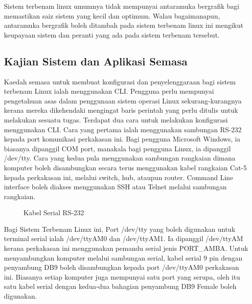 Sistem terbenam linux umumnya tidak mempunyai antaramuka bergrafik bagi memastikan saiz sistem yang kecil dan optimum. Walau bagaimanapun, antaramuka bergrafik boleh ditambah pada sistem terbenam linux ini mengikut keupayaan sistem dan peranti yang ada pada sistem terbenam tersebut.

\subsection{Kajian Sistem dan Aplikasi Semasa}
Kaedah semasa untuk membuat konfigurasi dan penyelenggaraan bagi sistem terbenam Linux ialah menggunakan CLI. Pengguna perlu mempunyai pengetahuan asas dalam penggunaan sistem operasi Linux sekurang-kurangnya kerana mereka dikehendaki mengingat baris perintah yang perlu ditulis untuk melakukan sesuatu tugas. Terdapat dua cara untuk melakukan konfigurasi menggunakan CLI. Cara yang pertama ialah menggunakan sambungan RS-232 kepada port komunikasi perkakasan ini. Bagi pengguna Microsoft Windows, ia biasanya dipanggil COM port, manakala bagi pengguna Linux, ia dipanggil /dev/tty. Cara yang kedua pula menggunakan sambungan rangkaian dimana komputer boleh disambungkan secara terus menggunakan kabel rangkaian Cat-5 kepada perkakasan ini, melalui switch, hub, ataupun router. Command Line interface boleh diakses menggunakan SSH atau Telnet melalui sambungan rangkaian.

\begin{figure}[!h]
\caption[Kabel Serial RS-232]{Kabel Serial RS-232}
\label{c2:f1}
\end{figure}

Bagi Sistem Terbenam Linux ini, Port /dev/tty yang boleh digunakan untuk terminal serial ialah /dev/ttyAM0 dan /dev/ttyAM1. Ia dipanggil /dev/ttyAM kerana perkakasan ini menggunakan pemandu serial jenis PORT\_AMBA. Untuk menyambungkan komputer melalui sambungan serial, kabel serial 9 pin dengan penyambung DB9 boleh disambungkan kepada port /dev/ttyAM0 perkakasan ini. Biasanya setiap komputer juga mempunyai satu port yang serupa, oleh itu satu kabel serial dengan kedua-dua bahagian penyambung DB9 Female boleh digunakan. 

